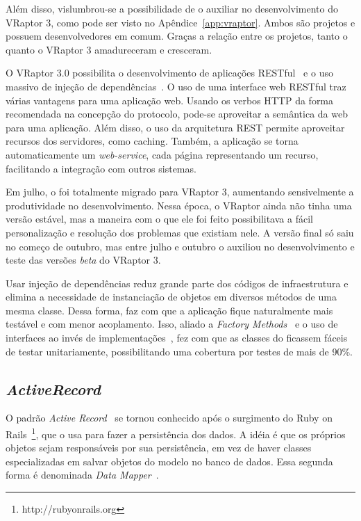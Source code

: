 Além disso, vislumbrou-se a possibilidade de o \calopsita{} auxiliar no desenvolvimento do VRaptor 3, como pode ser visto no Apêndice~\ref{app:vraptor}. Ambos são projetos \opensource{} e possuem desenvolvedores em comum. Graças a relação entre os projetos, tanto o \calopsita{} quanto o VRaptor 3 amadureceram e cresceram.

O VRaptor 3.0 possibilita o desenvolvimento de aplicações RESTful~\cite{rest} e o uso massivo de injeção de dependências~\cite{di}. O uso de uma interface web RESTful traz várias vantagens para uma aplicação web. Usando os verbos HTTP da forma recomendada na concepção do protocolo, pode-se aproveitar a semântica da web para uma aplicação. Além disso, o uso da arquitetura REST permite aproveitar recursos dos servidores, como caching. Também, a aplicação se torna automaticamente um \textit{web-service}, cada página representando um recurso, facilitando a integração com outros sistemas.

Em julho, o \calopsita{} foi totalmente migrado para VRaptor 3, aumentando sensivelmente a produtividade no desenvolvimento. Nessa época, o VRaptor ainda não tinha uma versão estável, mas a maneira com o que ele foi feito possibilitava a fácil personalização e resolução dos problemas que existiam nele. A versão final só saiu no começo de outubro, mas entre julho e outubro o \calopsita{} auxiliou no desenvolvimento e teste das versões \textit{beta} do VRaptor 3.

Usar injeção de dependências reduz grande parte dos códigos de infraestrutura e elimina a necessidade de instanciação de objetos em diversos métodos de uma mesma classe. Dessa forma, faz com que a aplicação fique naturalmente mais testável e com menor acoplamento. Isso, aliado a \textit{Factory Methods}~\cite{gof} e o uso de interfaces ao invés de implementações~\cite{effective}, fez com que as classes do \calopsita{} ficassem fáceis de testar unitariamente, possibilitando uma cobertura por testes de mais de 90\%.

\subsection{\textit{ActiveRecord}}

O padrão \textit{Active Record}~\cite{fowler} se tornou conhecido após o surgimento do Ruby on Rails~\footnote{http://rubyonrails.org}, que o usa para fazer a persistência dos dados. A idéia é que os próprios objetos sejam responsáveis por sua persistência, em vez de haver classes especializadas em salvar objetos do modelo no banco de dados. Essa segunda forma é denominada \textit{Data Mapper}~\cite{fowler}.

